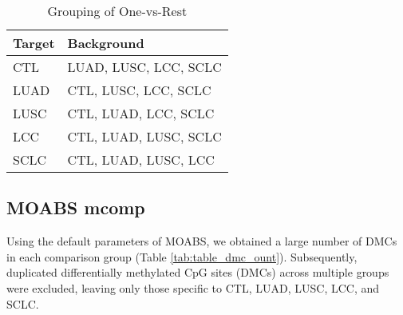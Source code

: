 \documentclass[12pt,letterpaper]{article}
\begin{document}
\begin{table}[!h]
    \begin{center}
        \caption{ Grouping of One-vs-Rest }
        \begin{tabular}{|l|l|}
            \hline
            Target & Background            \\
            \hline
            CTL    & LUAD, LUSC, LCC, SCLC \\
            LUAD   & CTL, LUSC, LCC, SCLC  \\
            LUSC   & CTL, LUAD, LCC, SCLC  \\
            LCC    & CTL, LUAD, LUSC, SCLC \\
            SCLC   & CTL, LUAD, LUSC, LCC  \\
            \hline
        \end{tabular}
    \end{center}
    \label{tab:grouping}
\end{table}

\subsection{MOABS mcomp}

Using the default parameters of MOABS, we obtained a large number of DMCs in each comparison group (Table \ref{tab:table_dmc_ount}).
Subsequently, duplicated differentially methylated CpG sites (DMCs) across multiple groups were excluded, leaving
only those specific to CTL, LUAD, LUSC, LCC, and SCLC.
\end{document}
